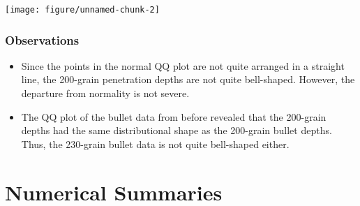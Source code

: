 \documentclass{beamer}\usepackage{graphicx, color}
\newenvironment{knitrout}{}{} %
\numberwithin{equation}{section}
\begin{document}
\begin{frame}[fragile]
\begin{knitrout}
\color{fgcolor}
\texttt{[image: figure/unnamed-chunk-2]} 

\end{knitrout}

\end{frame}

\begin{frame}
\frametitle{Observations}
\begin{itemize}
\item Since the points in the normal QQ plot are not quite arranged in a straight line, the 200-grain penetration depths are not quite bell-shaped. However, the departure from normality is not severe.
\pause \item The QQ plot of the bullet data from before revealed that the 200-grain depths had the same distributional shape as the 200-grain bullet depths. Thus, the 230-grain bullet data is not quite bell-shaped either.
\end{itemize}
\end{frame}


\section{Numerical Summaries}
\end{document}
